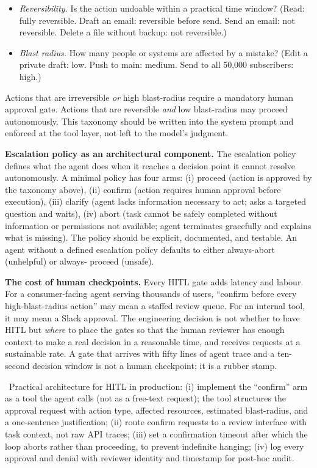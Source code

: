 \begin{itemize}
  \item \emph{Reversibility.} Is the action undoable within a
        practical time window? (Read: fully reversible. Draft an
        email: reversible before send. Send an email: not
        reversible. Delete a file without backup: not reversible.)
  \item \emph{Blast radius.} How many people or systems are
        affected by a mistake? (Edit a private draft: low. Push
        to main: medium. Send to all 50,000 subscribers: high.)
\end{itemize}

Actions that are irreversible \emph{or} high blast-radius
require a mandatory human approval gate. Actions that are
reversible \emph{and} low blast-radius may proceed autonomously.
This taxonomy should be written into the system prompt and
enforced at the tool layer, not left to the model's judgment.

\textbf{Escalation policy as an architectural component.} The
escalation policy defines what the agent does when it reaches
a decision point it cannot resolve autonomously. A minimal
policy has four arms: (i) proceed (action is approved by the
taxonomy above), (ii) confirm (action requires human approval
before execution), (iii) clarify (agent lacks information
necessary to act; asks a targeted question and waits), (iv)
abort (task cannot be safely completed without information or
permissions not available; agent terminates gracefully and
explains what is missing). The policy should be explicit,
documented, and testable. An agent without a defined escalation
policy defaults to either always-abort (unhelpful) or always-
proceed (unsafe).

\textbf{The cost of human checkpoints.} Every HITL gate adds
latency and labour. For a consumer-facing agent serving
thousands of users, ``confirm before every high-blast-radius
action'' may mean a staffed review queue. For an internal tool,
it may mean a Slack approval. The engineering decision is not
whether to have HITL but \emph{where} to place the gates so that
the human reviewer has enough context to make a real decision in
a reasonable time, and receives requests at a sustainable rate.
A gate that arrives with fifty lines of agent trace and a ten-
second decision window is not a human checkpoint; it is
a rubber stamp.

\Cons\ Practical architecture for HITL in production:
(i) implement the ``confirm'' arm as a tool the agent calls
(not as a free-text request); the tool structures the approval
request with action type, affected resources, estimated
blast-radius, and a one-sentence justification;
(ii) route confirm requests to a review interface with
task context, not raw API traces;
(iii) set a confirmation timeout after which the loop aborts
rather than proceeding, to prevent indefinite hanging;
(iv) log every approval and denial with reviewer identity and
timestamp for post-hoc audit.

